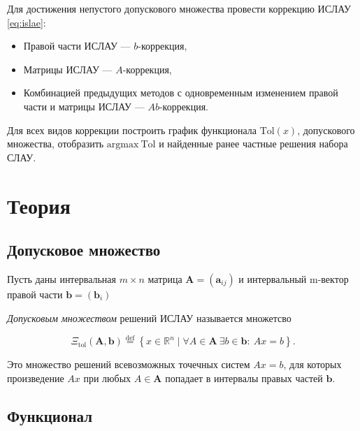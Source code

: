\documentclass{article}
\begin{document}
  Для достижения непустого допускового множества провести коррекцию ИСЛАУ
  \ref{eq:islae}:

  \begin{itemize}
    \item Правой части ИСЛАУ --- \( b \)-коррекция,
    \item Матрицы ИСЛАУ --- \( A \)-коррекция,
    \item Комбинацией предыдущих методов с одновременным изменением
      правой части и матрицы ИСЛАУ — \( Ab \)-коррекция.
  \end{itemize}

  Для всех видов коррекции построить график функционала
  \( \text{Tol} (x) \), допускового множества, отобразить
  \( \text{argmax} \ \text{Tol} \) и найденные ранее частные решения набора
  СЛАУ.

  \section{Теория}

  \subsection{Допусковое множество}

  Пусть даны интервальная \( m \times n \) матрица \( \mathbf{A} = (\mathbf{a}_{ij}) \) и
  интервальный m-вектор правой части \( \mathbf{b}  = (\mathbf{b}_i)\)
  \vspace{\baselineskip}

  \emph{Допусковым множеством} решений ИСЛАУ называется множетсво

  \begin{equation} \label{eq:tol_set_of_solutions}
    \Xi_{\text{tol}} (\mathbf{A}, \mathbf{b}) \stackrel{\text{def}}{=}
      \left \{ x \in \mathbb{R}^n \mid \forall A \in \mathbf{A} \ \exists b \in \mathbf{b}: \ Ax = b \right \}.
  \end{equation}

  \vspace{\baselineskip}

  Это множество решений всевозможных точечных систем  \( Ax = b \), для которых произведение \(Ax\) при любых \(A \in \mathbf{A}\) попадает в интервалы правых частей \( \mathbf{b} \).

  \subsection{Функционал}
\end{document}
